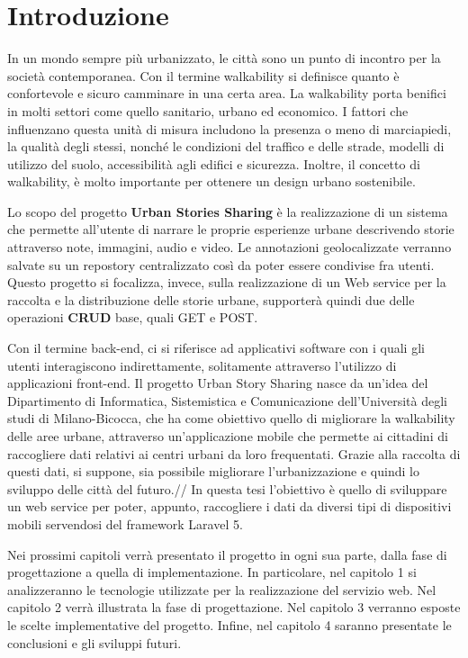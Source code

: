 \chapter*{Introduzione}

In un mondo sempre più urbanizzato, le città sono un punto di incontro per la società contemporanea.
Con il termine walkability si definisce quanto è confortevole e sicuro camminare in una certa area. La walkability porta benifici in molti settori come quello sanitario, urbano ed economico.
I fattori che influenzano questa unità di misura includono la presenza o meno di marciapiedi, la qualità degli stessi, nonché le condizioni del traffico e delle strade, modelli di utilizzo del suolo, accessibilità agli edifici e sicurezza.
Inoltre, il concetto di walkability, è molto importante per ottenere un design urbano sostenibile.

Lo scopo del progetto \textbf{Urban Stories Sharing} è la realizzazione di un sistema che permette all'utente di narrare le proprie esperienze urbane descrivendo storie attraverso note, immagini, audio e video. Le annotazioni geolocalizzate verranno salvate su un repostory centralizzato così da poter essere condivise fra utenti. Questo progetto si focalizza, invece, sulla realizzazione di un Web service per la raccolta e la distribuzione delle storie urbane, supporterà quindi due delle operazioni \textbf{CRUD} base, quali GET e POST. 

Con il termine back-end, ci si riferisce ad applicativi software con i quali gli utenti interagiscono indirettamente, solitamente attraverso l'utilizzo di applicazioni front-end.
Il progetto Urban Story Sharing nasce da un'idea del Dipartimento di Informatica, Sistemistica e Comunicazione dell'Università degli studi di Milano-Bicocca, che ha come obiettivo quello di migliorare la walkability delle aree urbane, attraverso un'applicazione mobile che permette ai cittadini di raccogliere dati relativi ai centri urbani da loro frequentati.
Grazie alla raccolta di questi dati, si suppone, sia possibile migliorare l'urbanizzazione e quindi lo sviluppo delle città del futuro.//
In questa tesi l'obiettivo è quello di sviluppare un web service per poter, appunto, raccogliere i dati da diversi tipi di dispositivi mobili servendosi del framework Laravel 5.

Nei prossimi capitoli verrà presentato il progetto in ogni sua parte, dalla fase di progettazione a quella di implementazione.  In particolare, nel capitolo 1 si analizzeranno le tecnologie utilizzate per la realizzazione del servizio web. Nel capitolo 2 verrà illustrata la fase di progettazione. Nel capitolo 3 verranno esposte le scelte implementative del progetto. Infine, nel capitolo 4 saranno presentate le conclusioni e gli sviluppi futuri.

